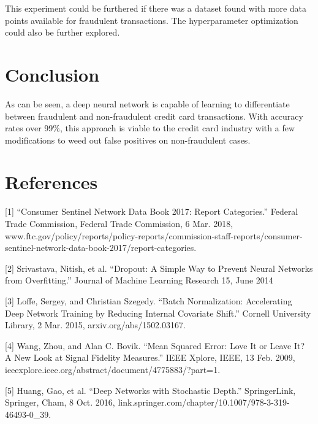 \documentclass{article}
\begin{document}
This experiment could be furthered if there was a dataset found with more 
data points available for fraudulent transactions. The hyperparameter 
optimization could also be further explored.

\section{Conclusion}

As can be seen, a deep neural network is capable of learning to differentiate between
 fraudulent and non-fraudulent credit card transactions. With accuracy rates over 99\%,
 this approach is viable to the credit card industry with a few modifications to weed out
 false positives on non-fraudulent cases.

\section*{References}

\small

[1] “Consumer Sentinel Network Data Book 2017: Report Categories.” Federal Trade Commission, 
Federal Trade Commission, 6 Mar. 2018, www.ftc.gov/policy/reports/policy-reports/commission-staff-reports/consumer-sentinel-network-data-book-2017/report-categories.

[2] Srivastava, Nitish, et al. “Dropout: A Simple Way to Prevent Neural Networks from Overfitting.” Journal of Machine Learning Research 15, June 2014

[3] Loffe, Sergey, and Christian Szegedy. “Batch Normalization: Accelerating Deep Network Training by Reducing Internal Covariate Shift.” Cornell University Library, 2 Mar. 2015, arxiv.org/abs/1502.03167.

[4] Wang, Zhou, and Alan C. Bovik. “Mean Squared Error: Love It or Leave It? A New Look at Signal Fidelity Measures.” IEEE Xplore, IEEE, 13 Feb. 2009, ieeexplore.ieee.org/abstract/document/4775883/?part=1.

[5] Huang, Gao, et al. “Deep Networks with Stochastic Depth.” SpringerLink, Springer, Cham, 8 Oct. 2016, link.springer.com/chapter/10.1007/978-3-319-46493-0\_39.
\end{document}
